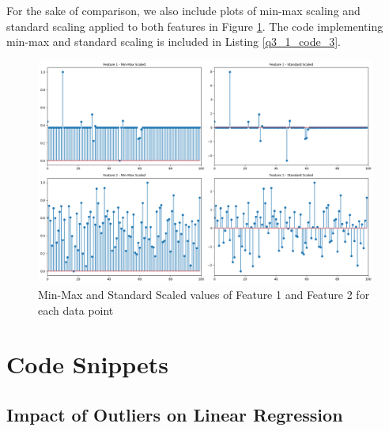 \documentclass{article}[a4paper]
\begin{document}
	For the sake of comparison, we also include plots of min-max scaling and standard scaling applied to both features
	in Figure \ref{q3_1_3_img}. The code implementing min-max and standard scaling is included in Listing \ref{q3_1_code_3}.

	\begin{figure}[H]
		\centering
		\includegraphics[width=\linewidth]{images/q3_1_3.png}
		\caption{Min-Max and Standard Scaled values of Feature 1 and Feature 2 for each data point}
		\label{q3_1_3_img}
	\end{figure}

	
	

	\appendix
	\section{Code Snippets}
	\label{code}
		
	\subsection{Impact of Outliers on Linear Regression}
\end{document}
